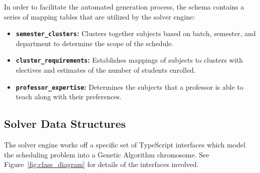 In order to facilitate the automated generation process, the schema contains a series of mapping tables that are utilized by the solver engine:
\begin{itemize}
    \item \textbf{\texttt{semester\_clusters}:} Clusters together subjects based on batch, semester, and department to determine the scope of the schedule.
    \item \textbf{\texttt{cluster\_requirements}:} Establishes mappings of subjects to clusters with electives and estimates of the number of students enrolled.
    \item \textbf{\texttt{professor\_expertise}:} Determines the subjects that a professor is able to teach along with their preferences.
\end{itemize}

\subsection{Solver Data Structures}
The solver engine works off a specific set of TypeScript interfaces which model the scheduling problem into a Genetic Algorithm chromosome. See Figure~\ref{fig:class_diagram} for details of the interfaces involved.

